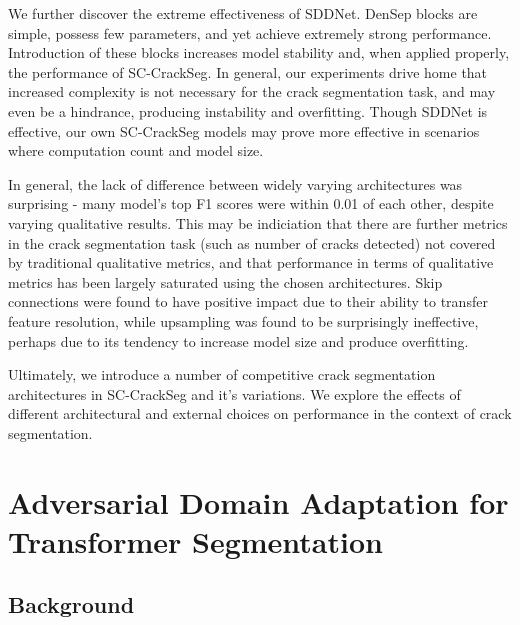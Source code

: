 \documentclass[a4paper,12pt]{report}
\begin{document}
We further discover the extreme effectiveness of SDDNet. DenSep blocks are simple, possess few parameters, and yet achieve extremely strong performance. Introduction of these blocks increases model stability and, when applied properly, the performance of SC-CrackSeg. In general, our experiments drive home that increased complexity is not necessary for the crack segmentation task, and may even be a hindrance, producing instability and overfitting. Though SDDNet is effective, our own SC-CrackSeg models may prove more effective in scenarios where computation count and model size.

In general, the lack of difference between widely varying architectures was surprising - many model's top F1 scores were within 0.01 of each other, despite varying qualitative results. This may be indiciation that there are further metrics in the crack segmentation task (such as number of cracks detected) not covered by traditional qualitative metrics, and that performance in terms of qualitative metrics has been largely saturated using the chosen architectures. Skip connections were found to have positive impact due to their ability to transfer feature resolution, while upsampling was found to be surprisingly ineffective, perhaps due to its tendency to increase model size and produce overfitting.

Ultimately, we introduce a number of competitive crack segmentation architectures in SC-CrackSeg and it's variations. We explore the effects of different architectural and external choices on performance in the context of crack segmentation.

\chapter{Adversarial Domain Adaptation for Transformer Segmentation}

\section{Background}

\end{document}

